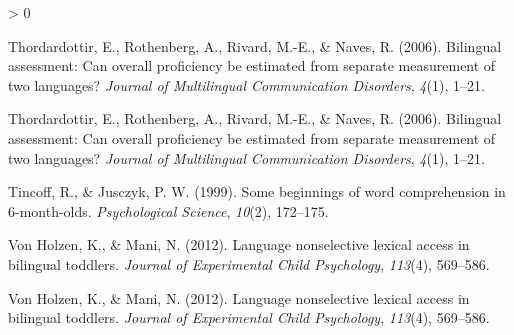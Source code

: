 \documentclass[
  english,
  man,man,floatsintext]{apa6}
\newlength{\cslhangindent}
\newenvironment{CSLReferences}[2] %
 {%
  \setlength{\parindent}{0pt}
  \ifodd #1 \everypar{\setlength{\hangindent}{\cslhangindent}}\ignorespaces\fi
  \ifnum #2 > 0
  \setlength{\parskip}{#2\baselineskip}
  \fi
 }%
 {}
\begin{document}
\begin{CSLReferences}{1}{0}
\leavevmode\hypertarget{ref-thordardottir2006bilingual}{}%
Thordardottir, E., Rothenberg, A., Rivard, M.-E., \& Naves, R. (2006). Bilingual assessment: Can overall proficiency be estimated from separate measurement of two languages? \emph{Journal of Multilingual Communication Disorders}, \emph{4}(1), 1--21.

\leavevmode\hypertarget{ref-thordardottir2006bilingual}{}%
Thordardottir, E., Rothenberg, A., Rivard, M.-E., \& Naves, R. (2006). Bilingual assessment: Can overall proficiency be estimated from separate measurement of two languages? \emph{Journal of Multilingual Communication Disorders}, \emph{4}(1), 1--21.

\leavevmode\hypertarget{ref-tincoff1999some}{}%
Tincoff, R., \& Jusczyk, P. W. (1999). Some beginnings of word comprehension in 6-month-olds. \emph{Psychological Science}, \emph{10}(2), 172--175.

\leavevmode\hypertarget{ref-von2012language}{}%
Von Holzen, K., \& Mani, N. (2012). Language nonselective lexical access in bilingual toddlers. \emph{Journal of Experimental Child Psychology}, \emph{113}(4), 569--586.

\leavevmode\hypertarget{ref-von2012language}{}%
Von Holzen, K., \& Mani, N. (2012). Language nonselective lexical access in bilingual toddlers. \emph{Journal of Experimental Child Psychology}, \emph{113}(4), 569--586.

\end{CSLReferences}

\endgroup
\end{document}
